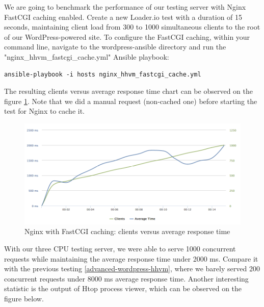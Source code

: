 We are going to benchmark the performance of our testing server with Nginx FastCGI caching enabled. Create a new Loader.io test with a duration of 15 seconds, maintaining client load from 300 to 1000 simultaneous clients to the root of our WordPress-powered site. \cite{Loader.io:nginx_hhvm_fastcgi_caching} To configure the FastCGI caching, within your command line, navigate to the wordpress-ansible directory and run the "nginx\_hhvm\_fastcgi\_cache.yml" Ansible playbook:

\begin{lstlisting}
ansible-playbook -i hosts nginx_hhvm_fastcgi_cache.yml
\end{lstlisting}

The resulting clients versus average response time chart can be observed on the figure \ref{fig:nginx_fastcgi_caching}. Note that we did a manual request (non-cached one) before starting the test for Nginx to cache it.

\begin{figure}[H]
\begin{center}
\includegraphics[scale=0.5]{figures/Nginx_FastCGI_caching.png}
\caption{Nginx with FastCGI caching: clients versus average response time}
\label{fig:nginx_fastcgi_caching}
\end{center}
\end{figure}

With our three CPU testing server, we were able to serve 1000 concurrent requests while maintaining the average response time under 2000 ms. Compare it with the previous testing \ref{advanced-wordpress-hhvm}, where we barely served 200 concurrent requests under 8000 ms average response time. Another interesting statistic is the output of Htop process viewer, which can be observed on the figure below.

